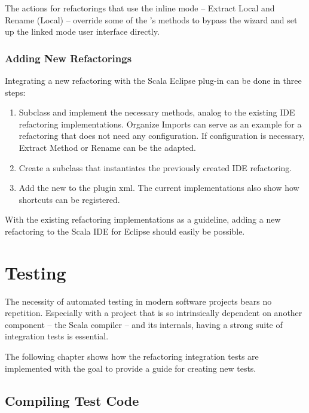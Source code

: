 \documentclass[10pt,a4paper,oneside]{scrreprt}
\begin{document}
The actions for refactorings that use the inline mode -- Extract Local and Rename (Local) -- override some of the 's methods to bypass the wizard and set up the linked mode user interface directly.

\subsection{Adding New Refactorings}

Integrating a new refactoring with the Scala Eclipse plug-in can be done in three steps:

\begin{enumerate}
  \item Subclass  and implement the necessary methods, analog to the existing IDE refactoring implementations. Organize Imports can serve as an example for a refactoring that does not need any configuration. If configuration is necessary, Extract Method or Rename can be the adapted.
  \item Create a  subclass that instantiates the previously created IDE refactoring.
  \item Add the new  to the plugin xml. The current implementations also show how shortcuts can be registered.
\end{enumerate}

With the existing refactoring implementations as a guideline, adding a new refactoring to the Scala IDE for Eclipse should easily be possible.

\chapter{Testing} \label{chapter:testing}

The necessity of automated testing in modern software projects bears no repetition. Especially with a project that is so intrinsically dependent on another component -- the Scala compiler -- and its internals, having a strong suite of integration tests is essential. 

The following chapter shows how the refactoring integration tests are implemented with the goal to provide a guide for creating new tests.

\section{Compiling Test Code}
\end{document}
